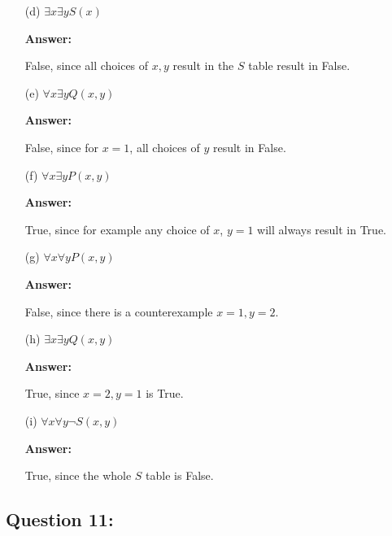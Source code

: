 \documentclass[12pt]{extreport}
\newcommand{\answer}[0]{\medskip \textbf{Answer:} \medskip}
\begin{document}
\begin{enumerate}
\begin{enumerate}
            \item[(d)] \( \exists x \exists y S(x) \)
            
                \answer

                False, since all choices of \( x, y \) result in the \( S \) table result in False.

            \item[(e)] \( \forall x \exists y Q(x, y) \)
            
                \answer 

                False, since for \( x = 1 \), all choices of \( y \) result in False.

            \item[(f)] \( \forall x \exists y P(x, y) \)
            
                \answer

                True, since for example any choice of \( x \), \( y = 1 \) will always result in True.

            \item[(g)] \( \forall x \forall y P(x, y) \)
            
                \answer

                False, since there is a counterexample \( x = 1, y = 2 \).

            \item[(h)] \( \exists x \exists y Q(x, y) \)
            
                \answer

                True, since \( x = 2 , y = 1 \) is True.

            \item[(i)] \( \forall x \forall y \neg S(x, y) \)
            
                \answer

                True, since the whole \( S \) table is False.

        \end{enumerate}

\end{enumerate}
\newpage

\subsection*{Question 11:}
\end{document}
